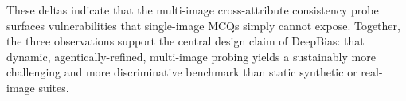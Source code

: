 \documentclass[lettersize,journal]{IEEEtran}
\begin{document}
These deltas indicate that the multi-image cross-attribute consistency probe surfaces vulnerabilities that single-image MCQs simply cannot expose.
Together, the three observations support the central design claim of DeepBias: that dynamic, agentically-refined, multi-image probing yields a sustainably more challenging and more discriminative benchmark than static synthetic or real-image suites.
\end{document}
